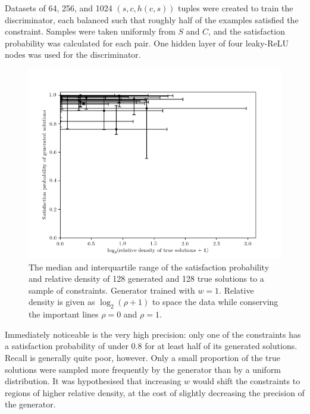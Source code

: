 \documentclass[../../main.tex]{subfiles}
\begin{document}
Datasets of 64, 256, and 1024 $(s,c,h(c,s))$ tuples were created to train the discriminator, each balanced such that roughly half of the examples satisfied the constraint.
Samples were taken uniformly from $S$ and $C$, and the satisfaction probability was calculated for each pair.
One hidden layer of four leaky-ReLU nodes was used for the discriminator.
\begin{figure}[H]
    \begin{center}
    \includegraphics[width=\textwidth]{solutionPropertiesEvenlyWeighted}
    \caption{
        The median and interquartile range of the satisfaction probability and relative density of 128 generated and 128 true solutions to a sample of constraints.
        Generator trained with $w=1$.
        Relative density is given as $\log_2(\rho+1)$ to space the data while conserving the important lines $\rho=0$ and $\rho=1$.
    }
    \label{fig:solutionPropertiesEvenlyWeighted}
    \end{center}
\end{figure}
Immediately noticeable is the very high precision: only one of the constraints has a satisfaction probability of under $0.8$ for at least half of its generated solutions.
Recall is generally quite poor, however.
Only a small proportion of the true solutions were sampled more frequently by the generator than by a uniform distribution.
It was hypothesised that increasing $w$ would shift the constraints to regions of higher relative density, at the cost of slightly decreasing the precision of the generator.
\end{document}
